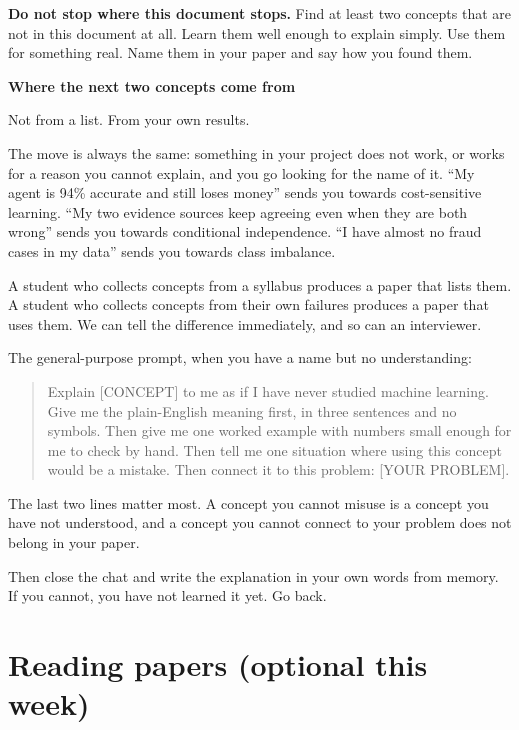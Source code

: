 \documentclass[11pt,a4paper]{article}
\newcommand{\boxtitle}[1]{{\bfseries #1}\par\vspace{2pt}}
\begin{document}
\textbf{Do not stop where this document stops.} Find at least two concepts that are not in this
document at all. Learn them well enough to explain simply. Use them for something real. Name
them in your paper and say how you found them.

\begin{sbbox}
\boxtitle{Where the next two concepts come from}
Not from a list. From your own results.

The move is always the same: something in your project does not work, or works for a reason you
cannot explain, and you go looking for the name of it. ``My agent is 94\% accurate and still
loses money'' sends you towards cost-sensitive learning. ``My two evidence sources keep agreeing
even when they are both wrong'' sends you towards conditional independence. ``I have almost no
fraud cases in my data'' sends you towards class imbalance.

A student who collects concepts from a syllabus produces a paper that lists them. A student who
collects concepts from their own failures produces a paper that uses them. We can tell the
difference immediately, and so can an interviewer.

The general-purpose prompt, when you have a name but no understanding:

\begin{quote}\ttfamily\small\raggedright
Explain [CONCEPT] to me as if I have never studied machine learning.
Give me the plain-English meaning first, in three sentences and no symbols.
Then give me one worked example with numbers small enough for me to check by hand.
Then tell me one situation where using this concept would be a mistake.
Then connect it to this problem: [YOUR PROBLEM].
\end{quote}

The last two lines matter most. A concept you cannot misuse is a concept you have not
understood, and a concept you cannot connect to your problem does not belong in your paper.

Then close the chat and write the explanation in your own words from memory. If you cannot, you
have not learned it yet. Go back.
\end{sbbox}

\section{Reading papers (optional this week)}
\label{sec:reading}
\end{document}
